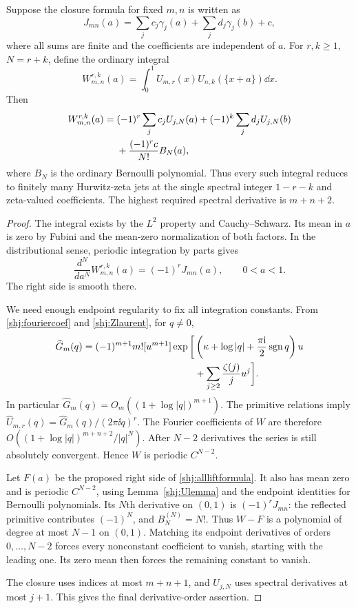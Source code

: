 \begin{theorem}\label{shj:alllift}
Suppose the closure formula for fixed $m,n$ is written as
\begin{equation}\label{shj:linearform}
J_{mn}(a)=\sum_j c_j\gamma_j(a)+\sum_j d_j\gamma_j(b)+c,
\end{equation}
where all sums are finite and the coefficients are independent of $a$.
For $r,k\ge1$, $N=r+k$, define the ordinary integral
\[
W_{m,n}^{r,k}(a)=\int_0^1U_{m,r}(x)U_{n,k}(\{x+a\})\dd x.
\]
Then
\begin{align}
W_{m,n}^{r,k}(a)={}&(-1)^r\sum_j c_jU_{j,N}(a)
+(-1)^k\sum_j d_jU_{j,N}(b)\notag\\
&+\frac{(-1)^r c}{N!}B_N(a),
\label{shj:allliftformula}
\end{align}
where $B_N$ is the ordinary Bernoulli polynomial. Thus every such integral reduces to finitely many Hurwitz-zeta jets at the single spectral integer $1-r-k$ and zeta-valued coefficients. The highest required spectral derivative is $m+n+2$.
\end{theorem}
\begin{proof}
The integral exists by the $L^2$ property and Cauchy--Schwarz. Its mean in $a$ is zero by Fubini and the mean-zero normalization of both factors. In the distributional sense, periodic integration by parts gives
\begin{equation}\label{shj:Wderivative}
\frac{d^N}{da^N}W_{m,n}^{r,k}(a)=(-1)^rJ_{mn}(a),\qquad 0<a<1.
\end{equation}
The right side is smooth there.

We need enough endpoint regularity to fix all integration constants. From \eqref{shj:fouriercoef} and \eqref{shj:Zlaurent}, for $q\ne0$,
\begin{align}
\widehat G_m(q)=(-1)^{m+1}m![u^{m+1}]
\exp\bigg[&\left(\kappa+\log|q|+\frac{\pi\mathrm{i}}{2}\operatorname{sgn} q\right)u\notag\\
&+\sum_{j\ge2}\frac{\zeta(j)}j u^j\bigg].
\label{shj:Gfourier}
\end{align}
In particular $\widehat G_m(q)=O_m((1+\log|q|)^{m+1})$.
The primitive relations imply
$\widehat U_{m,r}(q)=\widehat G_m(q)/(2\pi\ii q)^r$.
The Fourier coefficients of $W$ are therefore
$O((1+\log|q|)^{m+n+2}/|q|^N)$.
After $N-2$ derivatives the series is still absolutely convergent. Hence $W$ is periodic $C^{N-2}$.

Let $F(a)$ be the proposed right side of \eqref{shj:allliftformula}. It also has mean zero and is periodic $C^{N-2}$, using Lemma~\ref{shj:Ulemma} and the endpoint identities for Bernoulli polynomials. Its $N$th derivative on $(0,1)$ is $(-1)^rJ_{mn}$: the reflected primitive contributes $(-1)^N$, and $B_N^{(N)}=N!$. Thus $W-F$ is a polynomial of degree at most $N-1$ on $(0,1)$. Matching its endpoint derivatives of orders $0,\ldots,N-2$ forces every nonconstant coefficient to vanish, starting with the leading one. Its zero mean then forces the remaining constant to vanish.

The closure uses indices at most $m+n+1$, and $U_{j,N}$ uses spectral derivatives at most $j+1$. This gives the final derivative-order assertion.
\end{proof}

